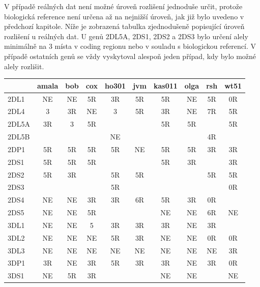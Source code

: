 \documentclass[czech,DP]{thesiskiv}
\numberwithin{equation}{section}
\begin{document}
\noindent
V případě reálných dat není možné úroveň rozlišení jednoduše určit, protože biologická reference není určena až na nejnižší úroveň, jak již bylo uvedeno v předchozí kapitole. Níže je zobrazená tabulka zjednodušeně popisující úroveň rozlišení u reálných dat. U genů 2DL5A, 2DS1, 2DS2 a 2DS3 bylo určení alely minimálně na 3 místa v coding regionu nebo v souladu s biologickou referencí. V případě ostatních genů se vždy vyskytoval alespoň jeden případ, kdy bylo možné alely rozlišit. 

\begin{center}
\tiny
{}
\begin{tabular}{l || c | c | c | c | c | c | c | c | c}
& amala & bob & cox & ho301 & jvm & kas011 & olga & rsh & wt51  \\
\hline
\hline
2DL1 & NE & NE & 5R & 3R & 5R & 5R & NE & 5R & 0R\\
2DL4 & 3 & 3R & NE & 3 & 5R & 3R & NE & 7R & 5R \\
2DL5A & 3R & 3 & 5R & &  & 5R & 5R & & 5R\\ 
2DL5B &  &  &  & NE & &  & & 4R & \\
2DP1 & 5R & 5R & 5R & 5R & NE & 5R & 5R & 3R & 3R \\
2DS1 & 5R & 5R & 5R & & & 5R & 3R & & 3R\\
2DS2  & 5R & 3R & & 5R & 5R & & & 5R & 5R\\ 
2DS3 & &  & & 5R & & & & & 0R\\
2DS4 & NE & NE & 3R & 3R & 6R & 5R & 3R & 0R &  \\
2DS5 & NE & NE & 5R & & & NE & NE & 6R & NE \\
3DL1 & NE & NE & 5 & 3R & 3R & 3R & NE & 3R &  \\
3DL2 & NE & NE & NE & 5R & 3R & NE & NE & 0R & 0R\\ 
3DL3 & NE & NE & NE & NE & NE & NE & NE & NE & 3R\\
3DP1 & 3R & NE & 3R & 5R & 3R & 3R & NE & 3R & 0R\\
3DS1 & NE & 5R & 3R &  & &  NE & NE & & NE\\


\end{tabular}
\end{center}
 
\end{document}

